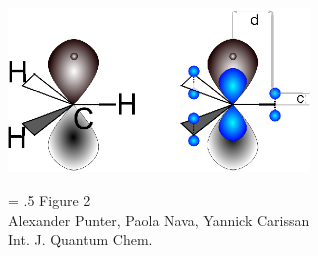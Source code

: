 \documentclass[12pt]{article}
\begin{document}
\begin{figure}
\begin{center}
\includegraphics[width=8cm]{scheme_complete.eps}
\end{center}
{\Large
\begin{minipage}[t]{3in}
\baselineskip = .5\baselineskip
Figure 2 \\
Alexander Punter, Paola Nava, Yannick Carissan\\
Int. J. Quantum Chem.
\end{minipage}
}
\end{figure}

\clearpage
\end{document}
